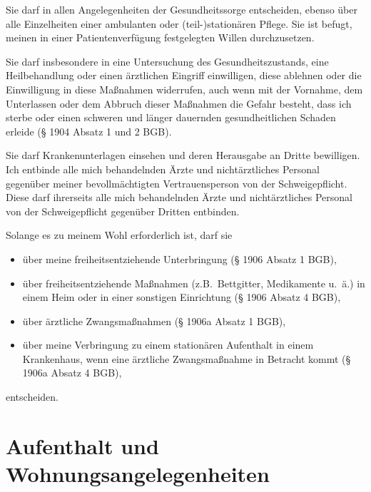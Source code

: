 \documentclass[pdftex,12pt,a4paper]{article}
\begin{document}
Sie darf in allen Angelegenheiten der Gesundheitssorge entscheiden, ebenso über
alle Einzelheiten einer ambulanten oder (teil-)stationären Pflege. Sie ist befugt,
meinen
in einer Patientenverfügung festgelegten Willen durchzusetzen.

 
 
Sie darf insbesondere in eine Untersuchung des Gesundheitszustands, eine
Heilbehandlung
oder einen ärztlichen Eingriff einwilligen, diese ablehnen oder die
Einwilligung in diese Maßnahmen widerrufen, auch wenn mit der Vornahme, dem
Unterlassen oder dem Abbruch dieser Maßnahmen die Gefahr besteht, dass ich
sterbe
oder einen schweren und länger dauernden gesundheitlichen Schaden erleide
(§ 1904 Absatz 1 und 2 BGB).

 
 
Sie darf Krankenunterlagen einsehen und deren Herausgabe an Dritte bewilligen.
Ich entbinde alle mich behandelnden Ärzte und nichtärztliches Personal gegenüber
meiner bevollmächtigten Vertrauensperson von der Schweigepflicht. Diese darf ihrerseits
alle mich behandelnden Ärzte und nichtärztliches Personal von der Schweigepflicht
gegenüber Dritten entbinden.

 
 
Solange es zu meinem Wohl erforderlich ist, darf sie

\begin{itemize}

\item über meine freiheitsentziehende Unterbringung (§ 1906 Absatz 1 BGB), 

\item über freiheitsentziehende Maßnahmen (z.B.\ Bettgitter, Medikamente u.\ ä.) in einem Heim oder in einer sonstigen Einrichtung (§ 1906 Absatz 4 BGB),

\item über ärztliche Zwangsmaßnahmen (§ 1906a Absatz 1 BGB),

\item über meine Verbringung zu einem stationären Aufenthalt in einem Krankenhaus, wenn eine ärztliche Zwangsmaßnahme in Betracht kommt (§ 1906a Absatz 4 BGB), 


\end{itemize}

entscheiden.

\section{Aufenthalt und Wohnungsangelegenheiten} 
\end{document}
